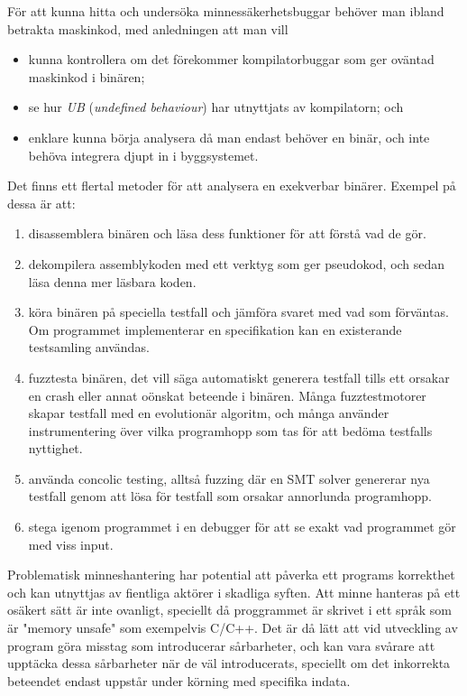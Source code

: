 För att kunna hitta och undersöka minnessäkerhetsbuggar behöver man ibland betrakta maskinkod, med
anledningen att man vill
\begin{itemize}
  \item kunna kontrollera om det förekommer kompilatorbuggar som ger oväntad maskinkod i binären;
  \item se hur \emph{UB} (\emph{undefined behaviour}) har utnyttjats av kompilatorn; och
  \item enklare kunna börja analysera då man endast behöver en binär, och inte behöva integrera
djupt in i byggsystemet.
\end{itemize}

Det finns ett flertal metoder för att analysera en exekverbar binärer. Exempel på dessa är att: 
\begin{enumerate}
  \item disassemblera binären och läsa dess funktioner för att förstå vad de gör.
  \item dekompilera assemblykoden med ett verktyg som ger pseudokod, och sedan läsa denna mer
    läsbara koden.
  \item köra binären på speciella testfall och jämföra svaret med vad som förväntas. Om
    programmet implementerar en specifikation kan en existerande testsamling användas.
  \item fuzztesta binären, det vill säga automatiskt generera testfall tills ett orsakar en crash eller
    annat oönskat beteende i binären. Många fuzztestmotorer skapar testfall med en evolutionär
    algoritm, och många använder instrumentering över vilka programhopp som tas för att bedöma
    testfalls nyttighet.
  \item använda concolic testing, alltså fuzzing där en SMT solver genererar nya testfall genom att
    lösa för testfall som orsakar annorlunda programhopp.
  \item stega igenom programmet i en debugger för att se exakt vad programmet gör med viss input.
\end{enumerate}

Problematisk minneshantering har potential att påverka ett programs korrekthet och 
kan utnyttjas av fientliga aktörer i skadliga syften. Att minne hanteras på ett 
osäkert sätt är inte ovanligt, speciellt då proggrammet är skrivet i ett språk som är 
"memory unsafe" som exempelvis C/C++. Det är då lätt att vid utveckling av program 
göra misstag som introducerar sårbarheter, och kan vara svårare att upptäcka dessa 
sårbarheter när de väl introducerats, speciellt om det inkorrekta beteendet endast 
uppstår under körning med specifika indata.

